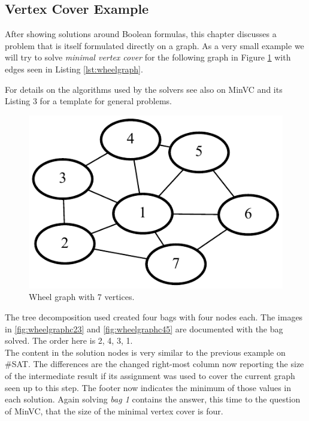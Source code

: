 \documentclass[a4paper, 12pt, bibliography=totoc]{scrartcl}
\begin{document}
\subsection{Vertex Cover Example}\label{sec:minvc}

After showing solutions around Boolean formulas, this chapter discusses a problem that is itself formulated directly on a graph.
As a very small example we will try to solve \textit{minimal vertex cover} for the following graph in Figure \ref{fig:wheelgraph} with edges seen in Listing \ref{lst:wheelgraph}.
%


For details on the algorithms used by the solvers see also \cite[Ch. 4.2]{dpdbpadl2020} on MinVC and its Listing 3 for a template for general problems.


\begin{figure}[H]
	\centering
	\includegraphics[]{images/WheelGraph7/graph1.pdf}
	\caption{Wheel graph with 7 vertices.}
	\label{fig:wheelgraph}
\end{figure}

The tree decomposition used created four bags with four nodes each.
The images in \ref{fig:wheelgraphc23} and \ref{fig:wheelgraphc45} are documented with the bag solved. The order here is 2, 4, 3, 1.\\
\medskip\noindent
The content in the solution nodes is very similar to the previous example on \#SAT.
The differences are the changed right-most column now reporting the size of the intermediate result if its assignment was used to cover the current graph seen up to this step. The footer now indicates the minimum of those values in each solution.
Again solving \textit{bag 1} contains the answer, this time to the question of MinVC, that the size of the minimal vertex cover is four.\\
\end{document}
